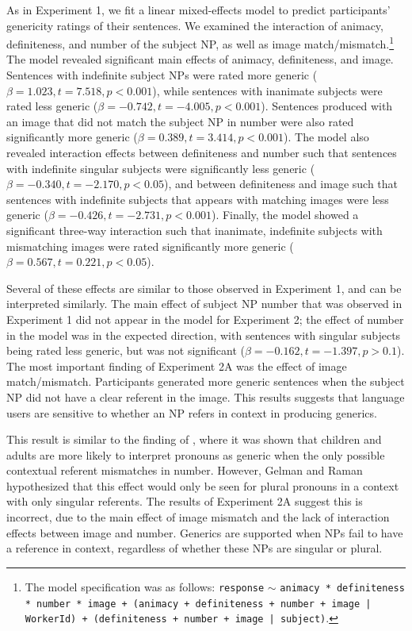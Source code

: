 \documentclass[10pt,letterpaper]{article}
\begin{document}
As in Experiment 1, we fit a linear mixed-effects model to predict participants' genericity ratings of their sentences. We examined the interaction of animacy, definiteness, and number of the subject NP, as well as image match/mismatch.\footnote{The model specification was as follows: \texttt{response} \(\sim\) \texttt{animacy * definiteness * number * image + (animacy + definiteness + number + image | WorkerId) + (definiteness + number + image | subject)}.} The model revealed significant main effects of animacy, definiteness, and image. Sentences with indefinite subject NPs were rated more generic (\(\beta = 1.023, t = 7.518, p < 0.001\)), while sentences with inanimate subjects were rated less generic (\(\beta = -0.742, t = -4.005, p < 0.001\)). Sentences produced with an image that did not match the subject NP in number were also rated significantly more generic (\(\beta = 0.389, t = 3.414, p < 0.001\)). The model also revealed interaction effects between definiteness and number such that sentences with indefinite singular subjects were significantly less generic (\(\beta = -0.340, t= -2.170, p < 0.05\)), and between definiteness and image such that sentences with indefinite subjects that appears with matching images were less generic (\(\beta = -0.426, t = -2.731, p < 0.001\)). Finally, the model showed a significant three-way interaction such that inanimate, indefinite subjects with mismatching images were rated significantly more generic (\(\beta = 0.567, t = 0.221, p < 0.05\)).

Several of these effects are similar to those observed in Experiment 1, and can be interpreted similarly. The main effect of subject NP number that was observed in Experiment 1 did not appear in the model for Experiment 2; the effect of number in the model was in the expected direction, with sentences with singular subjects being rated less generic, but was not significant (\(\beta = -0.162, t = -1.397, p > 0.1\)). The most important finding of Experiment 2A was the effect of image match/mismatch. Participants generated more generic sentences when the subject NP did not have a clear referent in the image. This results suggests that language users are sensitive to whether an NP refers in context in producing generics.

This result is similar to the finding of , where it was shown that children and adults are more likely to interpret pronouns as generic when the only possible contextual referent mismatches in number. However, Gelman and Raman hypothesized that this effect would only be seen for plural pronouns in a context with only singular referents. The results of Experiment 2A suggest this is incorrect, due to the main effect of image mismatch and the lack of interaction effects between image and number. Generics are supported when NPs fail to have a reference in context, regardless of whether these NPs are singular or plural.
\end{document}
